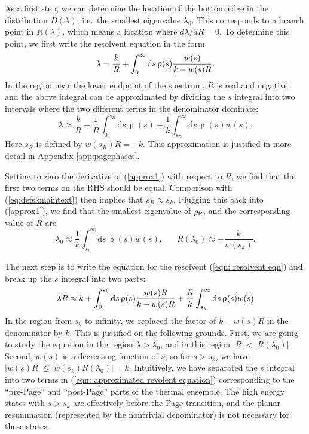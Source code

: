 \documentclass[12pt]{article}
\newcommand{\be}{\begin{equation}}
\newcommand{\ee}{\end{equation}}
\numberwithin{equation}{section}
\begin{document}
As a first step, we can determine the location of the bottom edge in the distribution $D(\lambda)$, i.e.~the smallest eigenvalue $\lambda_0$. This corresponds to a branch point in $R(\lambda)$, which means a location where $d\lambda/dR = 0$. To determine this point, we first write the resolvent equation in the form
\be
\lambda={k\over R}+\int_0^\infty \mathrm{d}s\,\uprho(s){w(s)\over k-w(s)R}.
\label{eqn:lambda(R)}
\ee
In the region near the lower endpoint of the spectrum, $R$ is real and negative, and the above integral can be approximated by dividing the $s$ integral into two intervals where the two different terms in the denominator dominate:
\be
\lambda \approx \frac{k}{R}-\frac{1}{R}\int_0^{s_R}\mathrm{d}s\,\uprho(s) + \frac{1}{k}\int_{s_R}^\infty \mathrm{d}s\,\uprho(s)w(s).\label{approx1}
\ee 
Here $s_R$ is defined by $w(s_R)R = -k$. This approximation is justified in more detail in Appendix \ref{app:pagephases}.

Setting to zero the derivative of (\ref{approx1}) with respect to $R$, we find that the first two terms on the RHS should be equal. Comparison with (\ref{eq:defskmaintext}) then implies that $s_R\approx s_k$. Plugging this back into (\ref{approx1}), we find that the smallest eigenvalue of $\rho_{\sf{R}}$, and the corresponding value of $R$ are
\be
\lambda_0 \approx \frac{1}{k}\int_{s_k}^\infty \mathrm{d}s\,\uprho(s) w(s),  \hspace{20pt} R(\lambda_0) \approx -\frac{k }{w(s_k)}.\label{lambda0}
\ee

The next step is to write the equation for the resolvent (\ref{eqn: resolvent eqn}) and break up the $s$ integral into two parts:
\be
\lambda R\approx k+\int_0^{s_k} \mathrm{d}s\,\uprho(s){w(s)R\over k -w(s) R}+\frac{R}{k}\int_{s_k}^{\infty}\mathrm{d}s\,\uprho(s)w(s)%
\label{eqn: approximated revolent equation}
\ee
In the region from $s_k$ to infinity, we replaced the factor of $k-w(s)R$ in the denominator by $k$. This is justified on the following grounds. First, we are going to study the equation in the region $\lambda > \lambda_0$, and in this region $|R| < |R(\lambda_0)|$. Second, $w(s)$ is a decreasing function of $s$, so for $s > s_k$, we have $|w(s)R| \le |w(s_k) R(\lambda_0)| = k$. Intuitively, we have separated the $s$ integral into two terms in (\ref{eqn: approximated revolent equation}) corresponding to the ``pre-Page'' and ``post-Page'' parts of the thermal ensemble. The high energy states with $s > s_k$ are effectively before the Page transition, and the planar resummation (represented by the nontrivial denominator) is not necessary for these states. 
\end{document}
